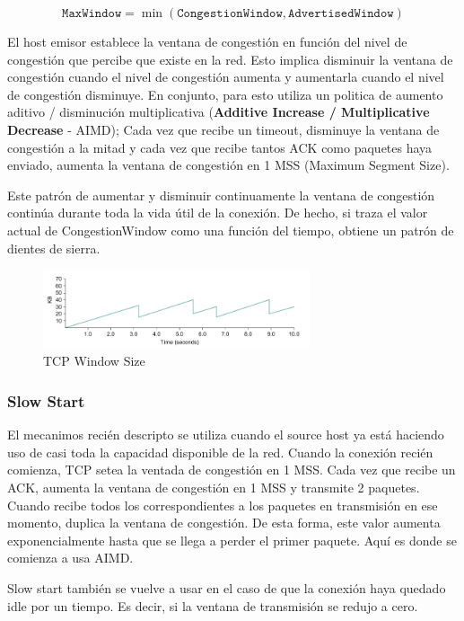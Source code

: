 \[\texttt{MaxWindow}= \min ( \texttt{CongestionWindow} , \texttt{AdvertisedWindow})\]

El host emisor establece la ventana de congestión en función del nivel de congestión que percibe que existe en la red. Esto implica disminuir la ventana de congestión cuando el nivel de congestión aumenta y aumentarla cuando el nivel de congestión disminuye. En conjunto, para esto utiliza un politica de aumento aditivo / disminución multiplicativa (\textbf{Additive Increase / Multiplicative Decrease} - AIMD); Cada vez que recibe un timeout, disminuye la ventana de congestión a la mitad y cada vez que recibe tantos ACK como paquetes haya enviado, aumenta la ventana de congestión en 1 MSS (Maximum Segment Size).

Este patrón de aumentar y disminuir continuamente la ventana de congestión continúa durante toda la vida útil de la conexión. De hecho, si traza el valor actual de CongestionWindow como una función del tiempo, obtiene un patrón de dientes de sierra.

\begin{figure}[H]
	\centering
	\includegraphics[width=0.7\textwidth
]{images/tcp-congestion.png}
	\caption[TCP Window Size]{TCP Window Size}
	\label{fig:tcp-congesiton}
\end{figure}

\subsubsection{Slow Start}
El mecanimos recién descripto se utiliza cuando el source host ya está haciendo uso de casi toda la capacidad disponible de la red. Cuando la conexión recién comienza, TCP setea la ventada de congestión en 1 MSS. Cada vez que recibe un ACK, aumenta la ventana de congestión en 1 MSS y transmite 2 paquetes. Cuando recibe todos los correspondientes a los paquetes en transmisión en ese momento, duplica la ventana de congestión. De esta forma, este valor aumenta exponencialmente hasta que se llega a perder el primer paquete. Aquí es donde se comienza a usa AIMD.

Slow start también se vuelve a usar en el caso de que la conexión haya quedado idle por un tiempo. Es decir, si la ventana de transmisión se redujo a cero.

